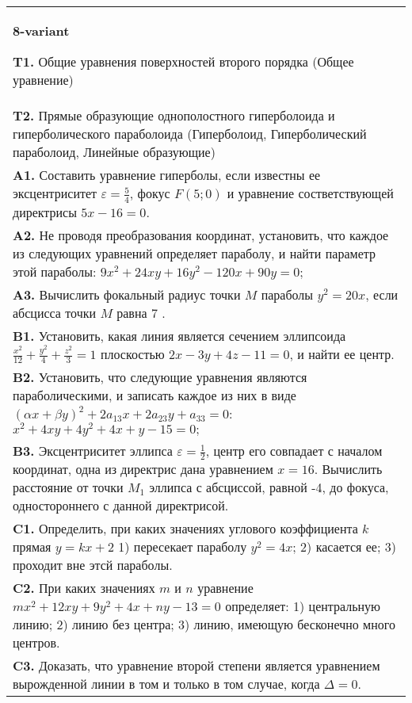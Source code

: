 \documentclass{article}
\begin{document}
\begin{tabular}{m{17cm}}
\textbf{8-variant}
\newline

\textbf{T1.} Общие уравнения поверхностей второго порядка (Общее уравнение) \\
\textbf{T2.} Прямые образующие однополостного гиперболоида и гиперболического параболоида (Гиперболоид, Гиперболический параболоид, Линейные образующие) \\
\textbf{A1.} Составить уравнение гиперболы, если известны ее эксцентриситет $\varepsilon=\frac{5}{4}$, фокус $F(5 ; 0)$ и уравнение состветствующей директрисы $5 x-16=0$. \\
\textbf{A2.} Не проводя преобразования координат, установить, что каждое из следующих уравнений определяет параболу, и найти параметр этой параболы: $9 x^2+24 x y+16 y^2-120 x+90 y=0$; \\
\textbf{A3.} Вычислить фокальный радиус точки $M$ параболы $y^2=20 x$, если абсцисса точки $M$ равна 7 . \\
\textbf{B1.} Установить, какая линия является сечением эллипсоида $\frac{x^2}{12}+\frac{y^2}{4}+\frac{z^2}{3}=1$ плоскостью $2 x-3 y+4 z-11=0$, и найти ее центр. \\
\textbf{B2.} Установить, что следующие уравнения являются параболическими, и записать каждое из них в виде $(\alpha x+\beta y)^2+2 a_{13} x+2 a_{23} y+a_{33}=0$: $x^2+4 x y+4 y^2+4 x+y-15=0 ;$ \\
\textbf{B3.} Эксцентриситет эллипса $\varepsilon=\frac{1}{2}$, центр его совпадает с началом координат, одна из директрис дана уравнением $x=16$. Вычислить расстояние от точки $M_1$ эллипса с абсциссой, равной -4, до фокуса, одностороннего с данной директрисой. \\
\textbf{C1.} Определить, при каких значениях углового коэффициента $k$ прямая $y=k x+2$ 1) пересекает параболу $y^2=4 x$; 2) касается ее; 3) проходит вне этсй параболы. \\
\textbf{C2.} При каких значениях $m$ и $n$ уравнение $m x^2+12 x y+9 y^2+4 x+n y-13=0$ определяет: 1) центральную линию; 2) линию без центра; 3) линию, имеющую бесконечно много центров. \\
\textbf{C3.} Доказать, что уравнение второй степени является уравнением вырожденной линии в том и только в том случае, когда $\Delta=0$. \\

\end{tabular}
\vspace{1cm}
\end{document}
